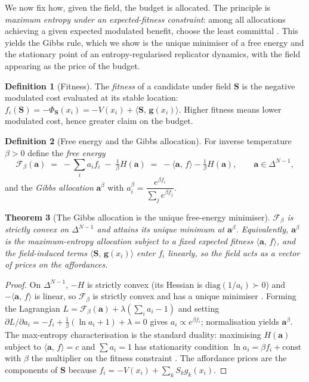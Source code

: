 \documentclass[11pt,a4paper]{article}
\theoremstyle{plain}
\newtheorem{theorem}{Theorem}[section]
\theoremstyle{definition}
\newtheorem{definition}[theorem]{Definition}
\theoremstyle{remark}
\newcommand{\simplex}{\Delta}                 %
\newcommand{\field}{\mathbf{S}}               %
\newcommand{\alloc}{\mathbf{a}}               %
\newcommand{\feat}{\mathbf{g}}                %
\newcommand{\Pot}{\Phi}                       %
\newcommand{\Free}{\mathcal{F}}               %
\newcommand{\inner}[2]{\langle #1,\,#2\rangle}
\begin{document}
We now fix how, given the field, the budget is allocated. The principle is
\emph{maximum entropy under an expected-fitness constraint}: among all
allocations achieving a given expected modulated benefit, choose the least
committal \citep{jaynes1957}. This yields the Gibbs rule, which we show is the
unique minimiser of a free energy and the stationary point of an
entropy-regularised replicator dynamics, with the field appearing as the price
of the budget.

\begin{definition}[Fitness]
\label{def:fitness}
The \emph{fitness} of a candidate under field $\field$ is the negative modulated
cost evaluated at its stable location:
$f_i(\field)=-\Pot_\field(x_i)=-V(x_i)+\inner{\field}{\feat(x_i)}$. Higher
fitness means lower modulated cost, hence greater claim on the budget.
\end{definition}

\begin{definition}[Free energy and the Gibbs allocation]
\label{def:gibbs}
For inverse temperature $\beta>0$ define the \emph{free energy}
\begin{equation}
\Free_\beta(\alloc)\;=\;-\sum_i a_i f_i \;-\;\tfrac{1}{\beta}H(\alloc)
\;=\;-\inner{\alloc}{f}-\tfrac1\beta H(\alloc),\qquad \alloc\in\simplex^{N-1},
\label{eq:freeenergy}
\end{equation}
and the \emph{Gibbs allocation} $\alloc^\beta$ with
$a^\beta_i=\dfrac{e^{\beta f_i}}{\sum_j e^{\beta f_j}}$.
\end{definition}

\begin{theorem}[The Gibbs allocation is the unique free-energy minimiser]
\label{thm:gibbs}
$\Free_\beta$ is strictly convex on $\simplex^{N-1}$ and attains its unique
minimum at $\alloc^\beta$. Equivalently, $\alloc^\beta$ is the maximum-entropy
allocation subject to a fixed expected fitness $\inner{\alloc}{f}$, and the
field-induced terms $\inner{\field}{\feat(x_i)}$ enter $f_i$ linearly, so the
field acts as a vector of \emph{prices} on the affordances.
\end{theorem}
\begin{proof}
On $\simplex^{N-1}$, $-H$ is strictly convex (its Hessian is $\mathrm{diag}
(1/a_i)\succ0$) and $-\inner{\alloc}{f}$ is linear, so $\Free_\beta$ is strictly
convex and has a unique minimiser \citep{boyd2004}. Forming the Lagrangian
$L=\Free_\beta(\alloc)+\lambda(\sum_i a_i-1)$ and setting
$\partial L/\partial a_i=-f_i+\tfrac1\beta(\ln a_i+1)+\lambda=0$ gives
$a_i\propto e^{\beta f_i}$; normalisation yields $\alloc^\beta$. The
max-entropy characterisation is the standard duality: maximising $H(\alloc)$
subject to $\inner{\alloc}{f}=c$ and $\sum a_i=1$ has stationarity condition
$\ln a_i=\beta f_i+\text{const}$ with $\beta$ the multiplier on the fitness
constraint \citep{jaynes1957}. The affordance prices are the components of
$\field$ because $f_i=-V(x_i)+\sum_k S_k g_k(x_i)$.
\end{proof}
\end{document}
